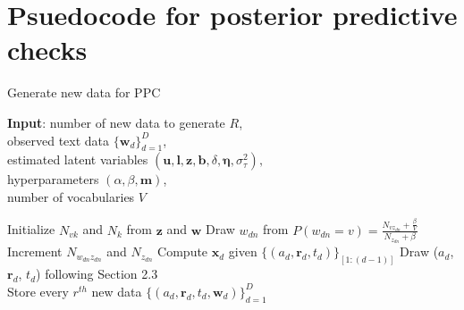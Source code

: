 \documentclass{article}
\begin{document}
\section{Psuedocode for posterior predictive checks} \label{sec: Pseudocode2}
      \begin{algorithm}[H]
      	\caption{Generate new data for PPC}
      \begin{algorithmic}
      	\STATE \textbf{Input}: number of new data to generate $R$,\\
      	observed text data $ \{\boldsymbol{w}_d\}_{d=1}^D$,\\
      	estimated latent variables $(\boldsymbol{u},  \boldsymbol{l},\boldsymbol{z}, \boldsymbol{b}, \delta, \boldsymbol{\eta},  \sigma_\tau^2),$\\
      	hyperparameters $(\alpha, \beta, \boldsymbol{m})$,\\
      	number of vocabularies $V$\\
            			\vskip 0.1in
 			
            		       \STATE Initialize $N_{vk}$ and $N_k$ from $\boldsymbol{z}$ and  $\boldsymbol{w}$  
      	  		\STATE Draw	$w_{dn}$ from $P(w_{dn} = v)= \frac{N_{vz_{dn}} +\frac{\beta}{V}}{N_{z_{dn}} + \beta}$\\  			
      	  		\STATE Increment $N_{w_{dn}z_{dn}}$ and $N_{z_{dn}}$ 		
      	  				\ENDFOR
      	  			\ENDIF
			\STATE  Compute $\boldsymbol{x}_{d}$ given $\{(a_{d}, \boldsymbol{r}_{d}, t_{d})\}_{[1:(d-1)]}$
      		\STATE	Draw ($a_{d}$, $\boldsymbol{r}_{d}$, $t_{d}$) following Section 2.3\\
\ENDFOR
\STATE Store every $r^{th}$ new data $\{(a_{d}, \boldsymbol{r}_{d}, t_{d}, \boldsymbol{w}_{d})\}_{d=1}^D$ 
      				\ENDFOR
      		\end{algorithmic}
      \end{algorithm}        
      	 



\end{document}
